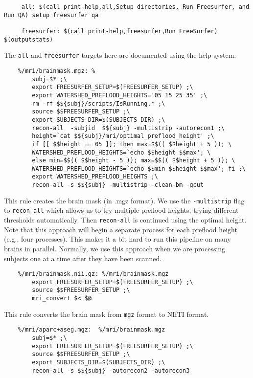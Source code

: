 \begin{lstlisting}
	 all: $(call print-help,all,Setup directories, Run Freesurfer, and Run QA) setup freesurfer qa

	 freesurfer: $(call print-help,freesurfer,Run FreeSurfer) $(outputstats)
\end{lstlisting}

The \texttt{all} and \texttt{freesurfer} targets here are documented
using the help system. 

\begin{lstlisting}
	%/mri/brainmask.mgz: %
		subj=$* ;\
		export FREESURFER_SETUP=$(FREESURFER_SETUP) ;\
		export WATERSHED_PREFLOOD_HEIGHTS='05 15 25 35' ;\
		rm -rf $${subj}/scripts/IsRunning.* ;\
		source $$FREESURFER_SETUP ;\
		export SUBJECTS_DIR=$(SUBJECTS_DIR) ;\
		recon-all  -subjid  $${subj} -multistrip -autorecon1 ;\
		height=`cat $${subj}/mri/optimal_preflood_height' ;\
		if [[ $$height == 05 ]]; then max=$$(( $$height + 5 )); \
		WATERSHED_PREFLOOD_HEIGHTS=`echo $$height $$max'; \
		else min=$$(( $$height - 5 )); max=$$(( $$height + 5 )); \
		WATERSHED_PREFLOOD_HEIGHTS=`echo $$min $$height $$max'; fi ;\
		export WATERSHED_PREFLOOD_HEIGHTS ;\
		recon-all -s $${subj} -multistrip -clean-bm -gcut
\end{lstlisting}

This rule creates the brain mask (in .mgz format). We use the
\texttt{-multistrip} flag to \texttt{recon-all} which allows us to try
multiple preflood heights, trying different thresholds
automatically. Then \texttt{recon-all} is continued using the optimal
height. Note that this approach will begin a separate process
for each preflood height (e.g., four processes). This makes it a bit
hard to run this pipeline on many brains in parallel. Normally, we use
this approach when we are processing subjects one at a time after they
have been scanned.

\begin{lstlisting}
	%/mri/brainmask.nii.gz: %/mri/brainmask.mgz
		export FREESURFER_SETUP=$(FREESURFER_SETUP) ;\
		source $$FREESURFER_SETUP ;\
		mri_convert $< $@
\end{lstlisting}
This rule converts the brain mask from \texttt{mgz} format to NIfTI format.

\begin{lstlisting}
	%/mri/aparc+aseg.mgz:  %/mri/brainmask.mgz 
		subj=$* ;\
		export FREESURFER_SETUP=$(FREESURFER_SETUP) ;\
		source $$FREESURFER_SETUP ;\
		export SUBJECTS_DIR=$(SUBJECTS_DIR) ;\
		recon-all -s $${subj} -autorecon2 -autorecon3 
\end{lstlisting}

